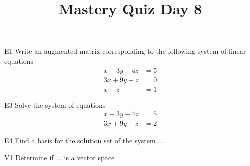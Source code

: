 \documentclass{sbgLAquiz}
\title{Mastery Quiz Day 8 }
\begin{document}
\begin{problem}{E1}
Write an augmented matrix corresponding to the following system of linear equations
\begin{align*}
x+3y-4z &= 5 \\
3x+9y+z &= 0 \\
x-z &= 1
\end{align*}
\end{problem}

\begin{problem}{E3}
Solve the system of equations
\begin{align*}
x+3y-4z &= 5 \\
3x+9y+z &= 2
\end{align*}
\end{problem}
\newpage

\begin{problem}{E4}
Find a basis for the solution set of the system ...
\end{problem}

\begin{problem}{V1}
Determine if ... is a vector space
\end{problem}
\end{document}
